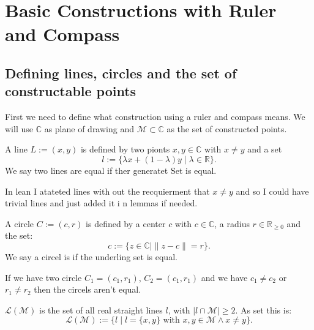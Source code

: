 \chapter{Basic Constructions with Ruler and Compass}

\section{Defining lines, circles and the set of constructable points}
First we need to define what construction using a ruler and compass means.
We will use $\mathbb{C}$ as plane of drawing and $\mathcal{M} \subset \mathbb{C}$ as the set of constructed points.

\begin{definition}[Line]
    \label{def:line}
    \leanok
    A line $L := (x,y)$ is defined by two pionts $x,y\in\mathbb{C}$ with $x\ne y$ and a set $$l:=\{\lambda x+(1-\lambda)y\mid\lambda\in\mathbb{R}\}.$$
    We say two lines are equal if ther generatet Set is equal.
\end{definition}
\begin{remark}
 In lean I atateted lines with out the recquierment that $x\ne y$ and so I could have trivial lines and just added it i n lemmas if needed.
\end{remark}


\begin{definition}[Circle]
    \label{def:circle}
    \leanok
    A circle $C := (c,r)$ is defined by a center $c$ with  $c\in\mathbb{C}$, a radius $r\in\mathbb{R}_{\ge 0}$ and the set: $$c:=\{z\in\mathbb{C} \mid\|z-c\|=r\}.$$ 
    We say a circel is if the underling set is equal.
\end{definition}

\begin{lemma}
    \label{lem:circle_not_eq_iff}
    \leanok
    If we have two circle $C_1 = (c_1,r_1)$, $C_2 = (c_1,r_1)$ and we have $c_1 \ne c_2$ or $r_1  \ne r_2 $ then the circels aren't equal. 
\end{lemma}


\begin{definition}
    \label{def:set_of_lines}
    \leanok
    $\mathcal{L(M)}$ is the set of all real straight lines $l$, with $| l\cap \mathcal{M} |\ge 2$. As set this is:
    \begin{equation*}
        \mathcal{L(M)} := \{l \mid l = \{x,y\} \text{ with }x,y \in \mathcal{M} \land x \neq y\}.
    \end{equation*}
\end{definition}


